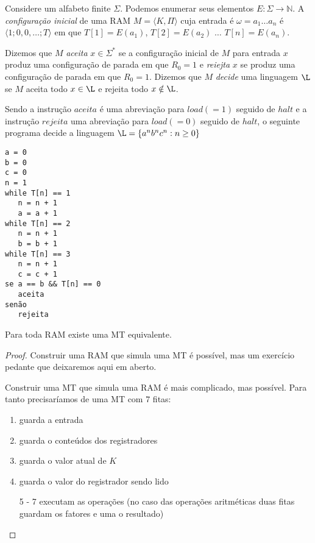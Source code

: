 Considere um alfabeto finite $\Sigma$.
Podemos enumerar seus elementos $E: \Sigma \to \mathbb{N}$.
A {\em configuração inicial} de uma RAM $M = \langle K, \Pi \rangle$ cuja entrada é $\omega = a_1 \dots a_n$ é $\langle 1;0,0, \dots; T \rangle$ em que $T[1] = E(a_1)$, $T[2] =E(a_2)$ $\dots$ $T[n] = E(a_n)$.

Dizemos que $M$ {\em aceita} $x \in \Sigma^*$ se a configuração inicial de $M$ para entrada $x$ produz uma configuração de parada em que $R_0 = 1$ e {\em reiejta} $x$ se produz uma configuração de parada em que $R_0 = 1$.
Dizemos que $M$ {\em decide} uma linguagem $\L$ se $M$ aceita todo $x \in \L$ e rejeita todo $x \notin \L$.

\begin{example}
  Sendo a instrução $aceita$ é uma abreviação para $load(=1)$ seguido de $halt$ e a instrução $rejeita$ uma abreviação para $load(=0)$ seguido de $halt$, o seguinte programa decide a linguagem $\L = \{a^nb^nc^n : n \geq 0 \}$

\begin{verbatim}
a = 0
b = 0
c = 0
n = 1
while T[n] == 1
   n = n + 1
   a = a + 1
while T[n] == 2
   n = n + 1
   b = b + 1
while T[n] == 3
   n = n + 1
   c = c + 1
se a == b && T[n] == 0
   aceita
senão
   rejeita
\end{verbatim}  
\end{example}

\begin{theorem}
  Para toda RAM existe uma MT equivalente.  
\end{theorem}
\begin{proof}
  Construir uma RAM que simula uma MT é possível, mas um exercício pedante que deixaremos aqui em aberto.

  Construir uma MT que simula uma RAM é mais complicado, mas possível.
  Para tanto precisaríamos de uma MT com $7$ fitas:
  \begin{enumerate}
  \item guarda a entrada
  \item guarda o conteúdos dos registradores
  \item guarda o valor atual de $K$
  \item guarda o valor do registrador sendo lido
  \item[5 - 7] executam as operações (no caso das operações aritméticas duas fitas guardam os fatores e uma o resultado) 
  \end{enumerate}
\end{proof}

